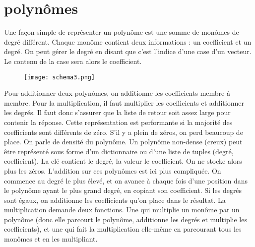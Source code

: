 \documentclass[10pt]{article}
\begin{document}
\section{polynômes}
Une façon simple de représenter un polynôme est une somme de monômes de degré différent. Chaque monôme contient deux informations : un coefficient et un degré. On peut gérer le degré en disant que c'est l'indice d'une case d'un vecteur. Le contenu de la case sera alors le coefficient. 
\begin{figure}[h!]
  \texttt{[image: schema3.png]}
\end{figure}
\newline 
Pour additionner deux polynômes, on additionne les coefficients membre à membre. Pour la multiplication, il faut multiplier les coefficients et additionner les degrés. Il faut donc s'assurer que la liste de retour soit assez large pour contenir la réponse. 
\newline \newline 
Cette représentation est performante si la majorité des coefficients sont différents de zéro. S'il y a plein de zéros, on perd beaucoup de place. On parle de densité du polynôme. 
\newline \newline 
Un polynôme non-dense (creux) peut être représenté sous forme d'un dictionnaire ou d'une liste de tuples (degré, coefficient). La clé contient le degré, la valeur le coefficient. On ne stocke alors plus les zéros. 
\newline \newline 
L'addition sur ces polynômes est ici plus compliquée. On commence au degré le plus élevé, et on avance à chaque fois d'une position dans le polynôme ayant le plus grand degré, en copiant son coefficient. Si les degrés sont égaux, on additionne les coefficients qu'on place dans le résultat. 
\newline \newline 
La multiplication demande deux fonctions. Une qui multiplie un monôme par un polynôme (donc elle parcourt le polynôme, additionne les degrés et multiplie les coefficients), et une qui fait la multiplication elle-même en parcourant tous les monômes et en les multipliant.
\end{document}
